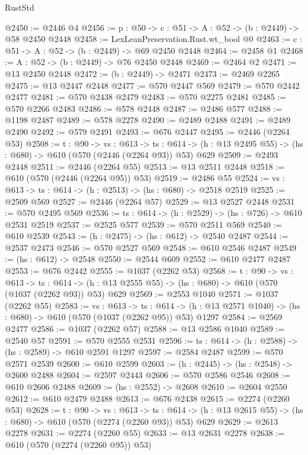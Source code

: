 \begin{lexlean}{RustStd}
\begin{coremodule}
@2450 := @2446 @4
@2456 := {p : @50} -> {c : @51} -> {A : @52} -> (b : @2449) -> @58 @2450 @2448
@2458 := LexLeanPreservation.Rust.wt_bool @0
@2463 := {c : @51} -> {A : @52} -> (b : @2449) -> @69 @2450 @2448
@2464 := @2458 @1
@2468 := {A : @52} -> (b : @2449) -> @76 @2450 @2448
@2469 := @2464 @2
@2471 := @13 @2450 @2448
@2472 := (b : @2449) -> @2471
@2473 := @2469 @2265
@2475 := @13 @2447 @2448
@2477 := @570 @2447 @569
@2479 := @570 @2442 @2477
@2481 := @570 @2438 @2479
@2483 := @570 @2275 @2481
@2485 := @570 @2266 @2483
@2486 := @578 @2448
@2487 := @2486 @577
@2488 := @1198 @2487
@2489 := @578 @2278
@2490 := @2489 @2488
@2491 := @2489 @2490
@2492 := @579 @2491
@2493 := @676 @2447
@2495 := @2446 (@2264 @53)
@2508 := {t : @90} ->
  {vs : @613} ->
  {ts : @614} -> (h : @13 @2495 @55) -> (hs : @680) -> @610 (@570 (@2446 (@2264 @93)) @53) @629
@2509 := @2493 @2448
@2511 := @2446 (@2264 @55)
@2513 := @13 @2511 @2448
@2518 := @610 (@570 (@2446 (@2264 @95)) @53)
@2519 := @2486 @55
@2524 := {vs : @613} -> {ts : @614} -> (h : @2513) -> (hs : @680) -> @2518 @2519
@2525 := @2509 @569
@2527 := @2446 (@2264 @57)
@2529 := @13 @2527 @2448
@2531 := @570 @2495 @569
@2536 := {ts : @614} -> (h : @2529) -> (hs : @726) -> @610 @2531 @2519
@2537 := @2525 @577
@2539 := @570 @2511 @569
@2540 := @610 @2539
@2543 := (h : @2475) -> (hs : @612) -> @2540 @2487
@2544 := @2537 @2473
@2546 := @570 @2527 @569
@2548 := @610 @2546 @2487
@2549 := (hs : @612) -> @2548
@2550 := @2544 @609
@2552 := @610 @2477 @2487
@2553 := @676 @2442
@2555 := @1037 (@2262 @53)
@2568 := {t : @90} ->
  {vs : @613} ->
  {ts : @614} -> (h : @13 @2555 @55) -> (hs : @680) -> @610 (@570 (@1037 (@2262 @93)) @53) @629
@2569 := @2553 @1040
@2571 := @1037 (@2262 @55)
@2583 := {vs : @613} ->
  {ts : @614} -> (h : @13 @2571 @1040) -> (hs : @680) -> @610 (@570 (@1037 (@2262 @95)) @53) @1297
@2584 := @2569 @2477
@2586 := @1037 (@2262 @57)
@2588 := @13 @2586 @1040
@2589 := @2540 @57
@2591 := @570 @2555 @2531
@2596 := {ts : @614} -> (h : @2588) -> (hs : @2589) -> @610 @2591 @1297
@2597 := @2584 @2487
@2599 := @570 @2571 @2539
@2600 := @610 @2599
@2603 := (h : @2445) -> (hs : @2548) -> @2600 @2488
@2604 := @2597 @2443
@2606 := @570 @2586 @2546
@2608 := @610 @2606 @2488
@2609 := (hs : @2552) -> @2608
@2610 := @2604 @2550
@2612 := @610 @2479 @2488
@2613 := @676 @2438
@2615 := @2274 (@2260 @53)
@2628 := {t : @90} ->
  {vs : @613} ->
  {ts : @614} -> (h : @13 @2615 @55) -> (hs : @680) -> @610 (@570 (@2274 (@2260 @93)) @53) @629
@2629 := @2613 @2278
@2631 := @2274 (@2260 @55)
@2633 := @13 @2631 @2278
@2638 := @610 (@570 (@2274 (@2260 @95)) @53)

\end{coremodule}
\end{lexlean}
